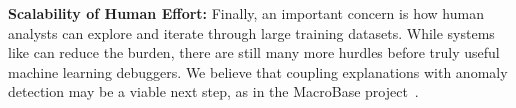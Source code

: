 \vspace{0.5em}\noindent\textbf{Scalability of Human Effort: } Finally, an important concern is how human analysts can explore and iterate through large training datasets. While systems like \sys can reduce the burden, there are still many more hurdles before truly useful machine learning debuggers. We believe that coupling explanations with anomaly detection may be a viable next step, as in the MacroBase project~\cite{bailis2017macrobase}.













